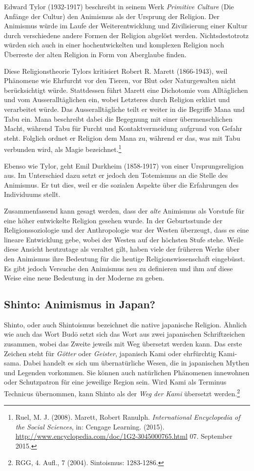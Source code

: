 Edward Tylor (1932-1917) beschreibt in seinem Werk \emph{Primitive Culture} (Die Anfänge der Cultur) den Animismus als der Ursprung der Religion. Der Animismus würde im Laufe der Weiterentwicklung und Zivilisierung einer Kultur durch verschiedene andere Formen der Religion abgelöst werden. Nichtsdestotrotz würden sich auch in einer hochentwickelten und komplexen Religion noch Überreste der alten Religion in Form von Aberglaube finden.

Diese Religionstheorie Tylors kritisiert Robert R. Marett (1866-1943), weil Phänomene wie Ehrfurcht vor den Tieren, vor Blut oder Naturgewalten nicht berücksichtigt würde. Stattdessen führt Marett eine Dichotomie vom Alltäglichen und vom Ausseralltäglichen ein, wobei Letzteres durch Religion erklärt und verarbeitet würde. Das Ausseralltägliche teilt er weiter in die Begriffe Mana und Tabu ein. Mana beschreibt dabei die Begegnung mit einer übermenschlichen Macht, während Tabu für Furcht und Kontaktvermeidung aufgrund von Gefahr steht. Folglich ordnet er Religion dem Mana zu, während er das, was mit Tabu verbunden wird, als Magie bezeichnet.\footnote{Ruel, M. J. (2008). \glqq Marett, Robert Ranulph\grqq. \emph{International Encyclopedia of the Social Sciences}, in: Cengage Learning. (2015). \url{http://www.encyclopedia.com/doc/1G2-3045000765.html} 07. September 2015.} 

Ebenso wie Tylor, geht Emil Durkheim (1858-1917) von einer Ursprungsreligion aus. Im Unterschied dazu setzt er jedoch den Totemismus an die Stelle des Animismus. Er tut dies, weil er die sozialen Aspekte über die Erfahrungen des Individuums stellt.

Zusammenfassend kann gesagt werden, dass der \emph{alte} Animismus als Vorstufe für eine höher entwickelte Religion gesehen wurde. In der Geburtsstunde der Religionssoziologie und der Anthropologie war der Westen überzeugt, dass es eine lineare Entwicklung gebe, wobei der Westen auf der höchsten Stufe stehe. Weile diese Ansicht heutzutage als veraltet gilt, haben viele der früheren Werke über den Animismus ihre Bedeutung für die heutige Religionswissenschaft eingebüsst. Es gibt jedoch Versuche den Animismus neu zu definieren und ihm auf diese Weise eine neue Bedeutung in der Moderne zu geben. 

\subsection{Shinto: Animismus in Japan?}
Shinto, oder auch Shintoismus bezeichnet die native japanische Religion. Ähnlich wie auch das Wort Bud\={o} setzt sich das Wort aus zwei japanischen Schriftzeichen zusammen, wobei das Zweite jeweils mit Weg übersetzt werden kann. Das erste Zeichen steht für \emph{Götter} oder \emph{Geister}, japanisch Kami oder ehrfürchtig Kami-sama. Dabei handelt es sich um übernatürliche Wesen, die in japanischen Mythen und Legenden vorkommen. Sie können auch natürlichen Phänomenen innewohnen oder Schutzpatron für eine jeweilige Region sein. Wird Kami als Terminus Technicus übernommen, kann Shinto als der \emph{Weg der Kami} übersetzt werden.\footnote{RGG, 4. Aufl., 7 (2004). Sintoismus: 1283-1286.}

